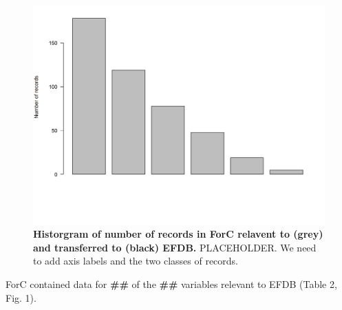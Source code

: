 \documentclass[, manuscript]{copernicus}
\begin{document}
\begin{figure}
\includegraphics[width=15cm]{figures_tables/PLACEHOLDER_Williams_Histogram_of_dominant_vegetation} \caption{\textbf{Historgram of number of records in ForC relavent to (grey) and transferred to (black) EFDB.} PLACEHOLDER. We need to add axis labels and the two classes of records. }\label{fig:fig_dominant_veg}
\end{figure}

ForC contained data for \textbf{\#\#} of the \textbf{\#\#} variables
relevant to EFDB (Table 2, Fig. 1).
\end{document}
